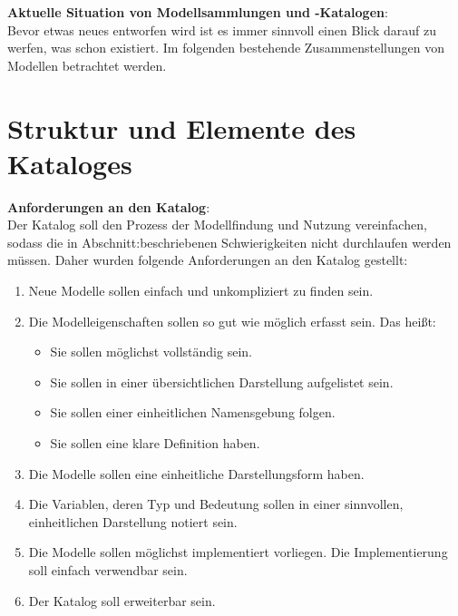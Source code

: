 \textbf{Aktuelle Situation von Modellsammlungen und -Katalogen}: \\
Bevor etwas neues entworfen wird ist es immer sinnvoll einen Blick darauf zu werfen, was schon existiert. Im folgenden bestehende Zusammenstellungen von Modellen betrachtet werden.
\section{Struktur und Elemente des Kataloges} %
\label{Ch:ErstProz:Sec:Struktur}
\textbf{Anforderungen an den Katalog}:\\ %
Der Katalog soll den Prozess der Modellfindung und Nutzung vereinfachen, sodass die in Abschnitt:\glqq {}\grqq beschriebenen Schwierigkeiten nicht durchlaufen werden müssen. Daher wurden folgende Anforderungen an den Katalog gestellt:
\begin{enumerate}[label=\textbf{Anforderung A.\arabic*}:, ref=\textbf{A.\arabic*}]
	\item \label{A.Findbarkeit}Neue Modelle sollen einfach und unkompliziert zu finden sein.
	\item \label{A.Modelleigenschaften}Die Modelleigenschaften sollen so gut wie möglich erfasst sein. Das heißt:
	\begin{itemize}[label=$\bullet$]
		\item Sie sollen möglichst vollständig sein.
		\item Sie sollen in einer übersichtlichen Darstellung aufgelistet sein.
		\item Sie sollen einer einheitlichen Namensgebung folgen.
		\item Sie sollen eine klare Definition haben.
	\end{itemize}
	\item \label{A.3}Die Modelle sollen eine einheitliche Darstellungsform haben.
	\item \label{A.4}Die Variablen, deren Typ und Bedeutung sollen in einer sinnvollen, einheitlichen Darstellung notiert sein.
	\item \label{A.5}Die Modelle sollen möglichst implementiert vorliegen. Die Implementierung soll einfach verwendbar sein.
	\item \label{A.Erweiterbarkeit}Der Katalog soll erweiterbar sein. %
\end{enumerate}

